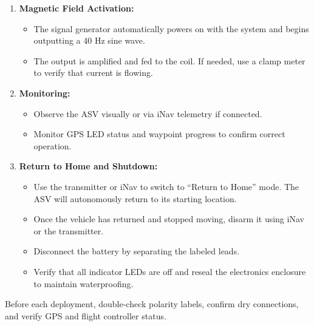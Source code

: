 \begin{enumerate}
    \item \textbf{Magnetic Field Activation:}
    \begin{itemize}
        \item The signal generator automatically powers on with the system and begins outputting a 40 Hz sine wave.
        \item The output is amplified and fed to the coil. If needed, use a clamp meter to verify that current is flowing.
    \end{itemize}

    \item \textbf{Monitoring:}
    \begin{itemize}
        \item Observe the ASV visually or via iNav telemetry if connected.
        \item Monitor GPS LED status and waypoint progress to confirm correct operation.
    \end{itemize}

    \item \textbf{Return to Home and Shutdown:}
    \begin{itemize}
        \item Use the transmitter or iNav to switch to “Return to Home” mode. The ASV will autonomously return to its starting location.
        \item Once the vehicle has returned and stopped moving, disarm it using iNav or the transmitter.
        \item Disconnect the battery by separating the labeled leads.
        \item Verify that all indicator LEDs are off and reseal the electronics enclosure to maintain waterproofing.
    \end{itemize}
\end{enumerate}

Before each deployment, double-check polarity labels, confirm dry connections, and verify GPS and flight controller status.
